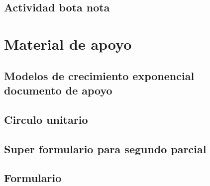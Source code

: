 \documentclass{book}
\begin{document}
\chapter{Actividad bota nota}


\part{Material de apoyo}
\chapter{Modelos de crecimiento exponencial documento de apoyo}


\chapter{Circulo unitario}


\chapter{Super formulario para segundo parcial}


\chapter{Formulario}

\end{document}
